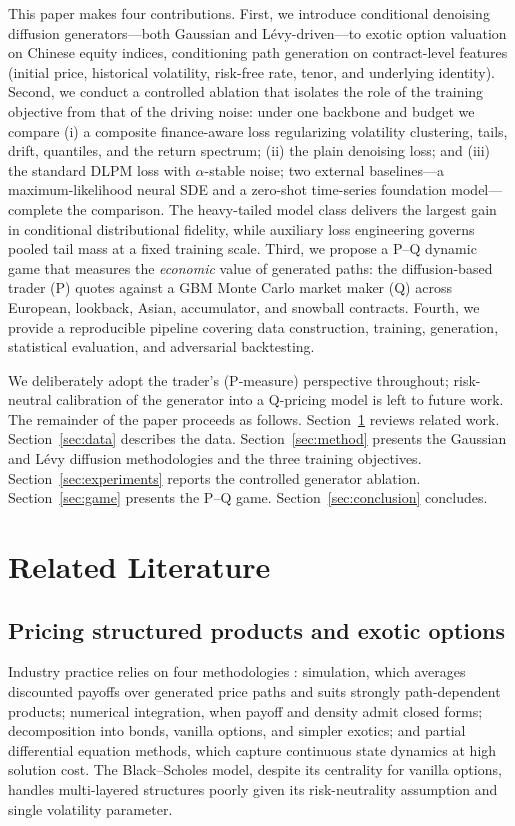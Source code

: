 \documentclass[12pt,letterpaper]{article}
\begin{document}
This paper makes four contributions. First, we introduce conditional
denoising diffusion generators---both Gaussian and L\'evy-driven---to exotic
option valuation on Chinese equity indices, conditioning path generation on
contract-level features (initial price, historical volatility, risk-free
rate, tenor, and underlying identity). Second, we conduct a controlled
ablation that isolates the role of the training objective from that of the
driving noise: under one backbone and budget we compare (i) a composite
finance-aware loss regularizing volatility clustering, tails, drift,
quantiles, and the return spectrum; (ii) the plain denoising loss; and (iii)
the standard DLPM loss with $\alpha$-stable noise; two external
baselines---a maximum-likelihood neural SDE and a zero-shot time-series
foundation model---complete the comparison. The heavy-tailed model class
delivers the largest gain in conditional distributional fidelity, while
auxiliary loss engineering governs pooled tail mass at a fixed training
scale. Third, we propose a P--Q dynamic game that measures the
\emph{economic} value of generated paths: the diffusion-based trader (P)
quotes against a GBM Monte Carlo market maker (Q) across European, lookback,
Asian, accumulator, and snowball contracts. Fourth, we provide a reproducible
pipeline covering data construction, training, generation, statistical
evaluation, and adversarial backtesting.

We deliberately adopt the trader's (P-measure) perspective throughout;
risk-neutral calibration of the generator into a Q-pricing model is left to
future work. The remainder of the paper proceeds as follows.
Section~\ref{sec:literature} reviews related work.
Section~\ref{sec:data} describes the data.
Section~\ref{sec:method} presents the Gaussian and L\'evy diffusion
methodologies and the three training objectives.
Section~\ref{sec:experiments} reports the controlled generator ablation.
Section~\ref{sec:game} presents the P--Q game.
Section~\ref{sec:conclusion} concludes.

\section{Related Literature}\label{sec:literature}

\subsection{Pricing structured products and exotic options}

Industry practice relies on four methodologies \citep{deng2014valuation}:
simulation, which averages discounted payoffs over generated price paths and
suits strongly path-dependent products; numerical integration, when payoff
and density admit closed forms; decomposition into bonds, vanilla options,
and simpler exotics; and partial differential equation methods, which capture
continuous state dynamics at high solution cost. The Black--Scholes model,
despite its centrality for vanilla options, handles multi-layered structures
poorly given its risk-neutrality assumption and single volatility parameter.
\end{document}
